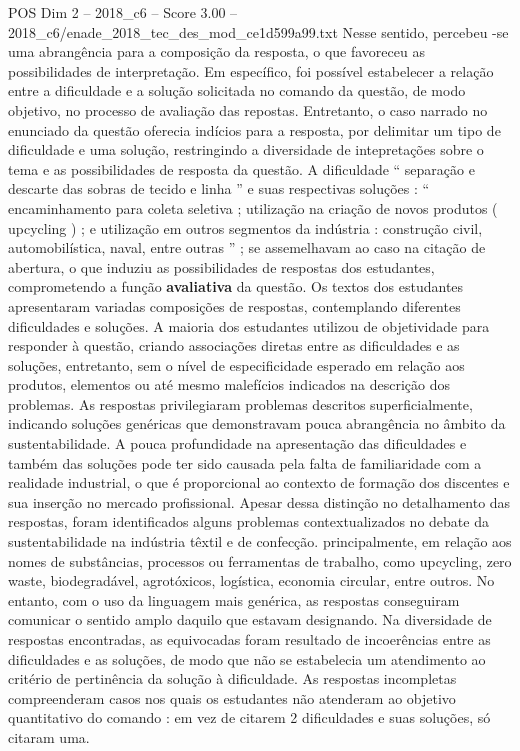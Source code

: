 \begin{textsample}{POS Dim 2 – 2018\_c6 – Score 3.00 – 2018\_c6/enade\_2018\_tec\_des\_mod\_ce1d599a99.txt}
Nesse sentido, percebeu -se uma abrangência para a composição da resposta, o que favoreceu as possibilidades de interpretação.
Em específico, foi possível estabelecer a relação entre a dificuldade e a solução solicitada no comando da questão, de modo objetivo, no processo de avaliação das repostas.
Entretanto, o caso narrado no enunciado da questão oferecia indícios para a resposta, por delimitar um tipo de dificuldade e uma solução, restringindo a diversidade de intepretações sobre o tema e as possibilidades de resposta da questão.
A dificuldade “ separação e descarte das sobras de tecido e linha ” e suas respectivas soluções : “ encaminhamento para coleta seletiva ; utilização na criação de novos produtos ( upcycling ) ; e utilização em outros segmentos da indústria : construção civil, automobilística, naval, entre outras ” ; se assemelhavam ao caso na citação de abertura, o que induziu as possibilidades de respostas dos estudantes, comprometendo a função \textbf{avaliativa} da questão.
Os textos dos estudantes apresentaram variadas composições de respostas, contemplando diferentes dificuldades e soluções.
A maioria dos estudantes utilizou de objetividade para responder à questão, criando associações diretas entre as dificuldades e as soluções, entretanto, sem o nível de especificidade esperado em relação aos produtos, elementos ou até mesmo malefícios indicados na descrição dos problemas.
As respostas privilegiaram problemas descritos superficialmente, indicando soluções genéricas que demonstravam pouca abrangência no âmbito da sustentabilidade.
A pouca profundidade na apresentação das dificuldades e também das soluções pode ter sido causada pela falta de familiaridade com a realidade industrial, o que é proporcional ao contexto de formação dos discentes e sua inserção no mercado profissional.
Apesar dessa distinção no detalhamento das respostas, foram identificados alguns problemas contextualizados no debate da sustentabilidade na indústria têxtil e de confecção. principalmente, em relação aos nomes de substâncias, processos ou ferramentas de trabalho, como upcycling, zero waste, biodegradável, agrotóxicos, logística, economia circular, entre outros.
No entanto, com o uso da linguagem mais genérica, as respostas conseguiram comunicar o sentido amplo daquilo que estavam designando.
Na diversidade de respostas encontradas, as equivocadas foram resultado de incoerências entre as dificuldades e as soluções, de modo que não se estabelecia um atendimento ao critério de pertinência da solução à dificuldade.
As respostas incompletas compreenderam casos nos quais os estudantes não atenderam ao objetivo quantitativo do comando : em vez de citarem 2 dificuldades e suas soluções, só citaram uma.

\end{textsample}
